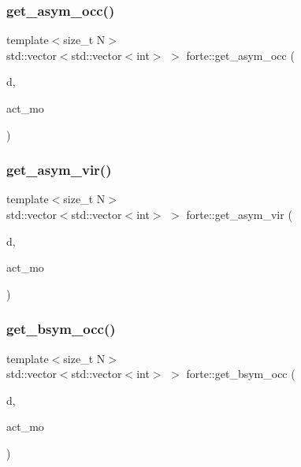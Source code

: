 \subsubsection{\texorpdfstring{get\+\_\+asym\+\_\+occ()}{get\_asym\_occ()}}
{\footnotesize\ttfamily template$<$size\+\_\+t N$>$ \\
std\+::vector$<$std\+::vector$<$int$>$ $>$ forte\+::get\+\_\+asym\+\_\+occ (\begin{DoxyParamCaption}\item[{const \mbox{\hyperlink{classforte_1_1_determinant_impl}{Determinant\+Impl}}$<$ N $>$ \&}]{d,  }\item[{const std\+::vector$<$ int $>$ \&}]{act\+\_\+mo }\end{DoxyParamCaption})}

\mbox{\label{namespaceforte_a039fabf20208c1cf5f63ec8d8a73634a}} 
\subsubsection{\texorpdfstring{get\+\_\+asym\+\_\+vir()}{get\_asym\_vir()}}
{\footnotesize\ttfamily template$<$size\+\_\+t N$>$ \\
std\+::vector$<$std\+::vector$<$int$>$ $>$ forte\+::get\+\_\+asym\+\_\+vir (\begin{DoxyParamCaption}\item[{const \mbox{\hyperlink{classforte_1_1_determinant_impl}{Determinant\+Impl}}$<$ N $>$ \&}]{d,  }\item[{const std\+::vector$<$ int $>$ \&}]{act\+\_\+mo }\end{DoxyParamCaption})}

\mbox{\label{namespaceforte_adaf5d0dec572bff69cf7fefe72327e8f}} 
\subsubsection{\texorpdfstring{get\+\_\+bsym\+\_\+occ()}{get\_bsym\_occ()}}
{\footnotesize\ttfamily template$<$size\+\_\+t N$>$ \\
std\+::vector$<$std\+::vector$<$int$>$ $>$ forte\+::get\+\_\+bsym\+\_\+occ (\begin{DoxyParamCaption}\item[{const \mbox{\hyperlink{classforte_1_1_determinant_impl}{Determinant\+Impl}}$<$ N $>$ \&}]{d,  }\item[{const std\+::vector$<$ int $>$ \&}]{act\+\_\+mo }\end{DoxyParamCaption})}


